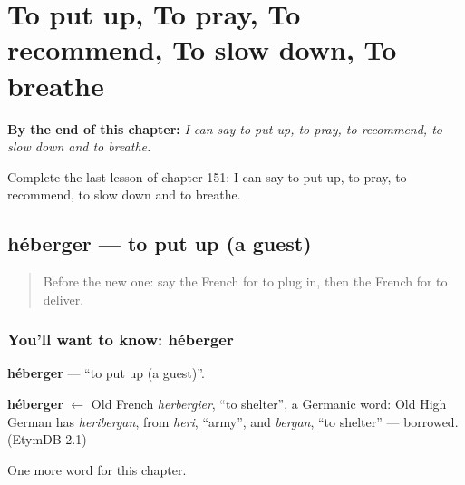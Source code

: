 
\chapter{To put up, To pray, To recommend, To slow down, To breathe}
\label{ch:fr-to-put-up-to-pray-to-recommend-to-slow-down-to-breathe}

\begin{chapteropening}
\textbf{By the end of this chapter:} \emph{I can say to put up, to pray, to recommend, to slow down and to breathe.}

Complete the last lesson of chapter 151: I can say to put up, to pray, to recommend, to slow down and to breathe.
\end{chapteropening}

\section[héberger]{héberger — to put up (a guest)}

\label{lesson:FR-C151-heberger}



\begin{quote}
Before the new one: say the French for to plug in, then the French for to deliver.
\end{quote}

\subsection*{You'll want to know: héberger}
\textbf{héberger} — \textquotedblleft{}to put up (a guest)\textquotedblright{}.

\begin{cousinweb}
\textbf{héberger} $\leftarrow$ Old French \emph{herbergier}, \textquotedblleft{}to shelter\textquotedblright{}, a Germanic word: Old High German has \emph{heribergan}, from \emph{heri}, \textquotedblleft{}army\textquotedblright{}, and \emph{bergan}, \textquotedblleft{}to shelter\textquotedblright{} — borrowed. (EtymDB 2.1)
\end{cousinweb}

\begin{grammarlens}[title={What you've built}]
One more word for this chapter.
\end{grammarlens}

